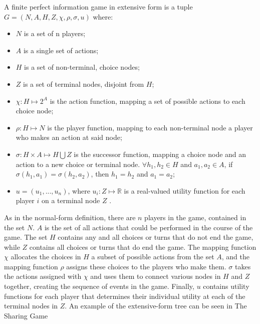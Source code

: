 \begin{define}
  A finite perfect information game in extensive form is a tuple $G = (N, A, H, Z, \chi, \rho, \sigma, u)$ where:
  \begin{itemize}
  \item $N$ is a set of n players;
  \item $A$ is a single set of actions;
  \item $H$ is a set of non-terminal, choice nodes;
  \item $Z$ is a set of terminal nodes, disjoint from $H$;
  \item $\chi: H\mapsto 2^A$ is the action function, mapping a set of possible actions to each choice node;
  \item $\rho: H\mapsto N$ is the player function, mapping to each non-terminal node a player who makes an action at said node;
  \item $\sigma: H\times A\mapsto H\bigcup Z$ is the successor function, mapping a choice node and an action to a new choice or terminal node. $\forall h_1, h_2\in H$ and $a_1, a_2\in A$, if $\sigma(h_1, a_1)=\sigma(h_2, a_2)$, then $h_1=h_2$ and $a_1=a_2$;
  \item $u=(u_1,...,u_n)$, where $u_i:Z\mapsto \mathbb{R}$ is a real-valued utility function for each player $i$ on a terminal node $Z$ \cite{shoh09}.
  \end{itemize}
\end{define}

As in the normal-form definition, there are $n$ players in the game, contained in the set $N$. $A$ is the set of all actions that could be performed in the course of the game. The set $H$ contains any and all choices or turns that do not end the game, while $Z$ contains all choices or turns that do end the game. The mapping function $\chi$ allocates the choices in $H$ a subset of possible actions from the set $A$, and the mapping function $\rho$ assigns these choices to the players who make them. $\sigma$ takes the actions assigned with $\chi$ and uses them to connect various nodes in $H$ and $Z$ together, creating the sequence of events in the game. Finally, $u$ contains utility functions for each player that determines their individual utility at each of the terminal nodes in $Z$. An example of the extensive-form tree can be seen in The Sharing Game\\

